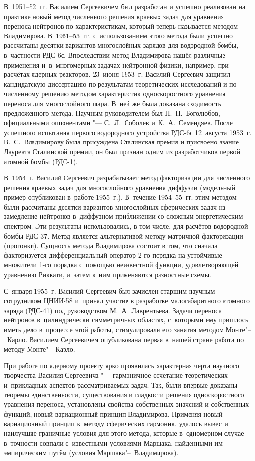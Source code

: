В~1951--52~гг. Василием Сергеевичем был разработан и успешно реализован на практике новый метод численного решения краевых задач для уравнения переноса нейтронов по характеристикам, который теперь называется методом Владимирова. 
В~1951--53~гг. с~использованием этого метода были успешно рассчитаны десятки вариантов многослойных зарядов для водородной бомбы, в~частности РДС-6с. 
Впоследствии метод Владимирова нашёл различные применения и~в~многомерных задачах нейтронной
физики, например, при расчётах ядерных реакторов. 
23~июня 1953~г. Василий Сергеевич защитил кандидатскую диссертацию по результатам теоретических исследований и по численному решению методом характеристик односкоростного уравнения переноса для многослойного шара.
В~ней же была доказана сходимость предложенного метода. 
Научным руководителем был Н.~Н.~Боголюбов, официальными оппонентами "--- С.~Л.~Соболев и~К.~А.~Семендяев. 
После успешного испытания первого водородного устройства РДС-6с 12~августа 1953~г. В.~С.~Владимирову была присуждена Сталинская премия и присвоено звание Лауреата Сталинской премии, он был признан одним из разработчиков первой атомной бомбы (РДС-1).

В~1954~г. Василий Сергеевич разрабатывает метод факторизации для численного решения краевых задач для многослойного уравнения диффузии (модельный пример опубликован в~работе 1955~г.). 
В~течение 1954--55~гг. этим методом были рассчитаны десятки вариантов многослойных сферических задач на замедление нейтронов в~диффузном приближении со сложным энергетическим спектром. 
Эти результаты использовались, в том числе, для расчётов водородной бомбы РДС-37. Метод является альтернативой методу матричной факторизации (прогонки). 
Сущность метода Владимирова состоит в том, что сначала факторизуется дифференциальный оператор \mbox{2-го} порядка на устойчивые множители 1-го порядка с~помощью неизвестной функции, удовлетворяющей уравнению Риккати, и~затем к~ним применяются разностные схемы.

С~января 1955~г. Василий Сергеевич был зачислен старшим научным сотрудником ЦНИИ-58 и~принял участие в разработке малогабаритного атомного заряда (РДС-41) под руководством М.~А.~Лаврентьева.
Задачи переноса нейтронов в~цилиндрически симметричных областях, с~которыми ему пришлось иметь дело в~процессе этой работы, стимулировали его занятия методом Монте"--~Карло. Василием Сергеевичем опубликована первая в~нашей стране работа по методу Монте"--~Карло.

При работе по ядерному проекту ярко проявилась характерная черта научного творчества Василия Сергеевича "--- гармоничное сочетание теоретических и~прикладных аспектов рассматриваемых задач. 
Так, были впервые доказаны теоремы единственности, существования и гладкости решения односкоростного уравнения переноса, установлены свойства собственных значений и собственных функций, новый
вариационный принцип Владимирова. 
Применяя новый вариационный принцип к~методу сферических гармоник, удалось вывести наилучшие граничные условия для этого метода, которые в~одномерном случае в~точности совпали с~известными условиями Маршака, найденными им эмпирическим путём (условия Маршака"--~Владимирова).


